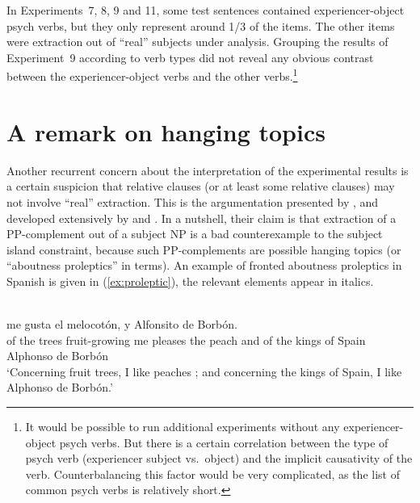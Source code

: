In Experiments~7, 8, 9 and 11, some test sentences contained experiencer-object psych verbs, but they only represent around 1/3 of the items. The other items were extraction out of ``real'' subjects under  analysis. Grouping the results of Experiment~9 according to verb types did not reveal any obvious contrast between the experiencer-object verbs and the other verbs.\footnote{It would be possible to run additional experiments without any experiencer-object psych verbs. But there is a certain correlation between the type of psych verb (experiencer subject vs.\ object) and the implicit causativity of the verb. Counterbalancing this factor would be very complicated, as the list of common psych verbs is relatively short.}

\section{A remark on hanging topics}
\label{ch:hanging-topics}

Another recurrent concern about the interpretation of the experimental results is a certain suspicion that relative clauses (or at least some relative clauses) may not involve ``real'' extraction.
This is the argumentation presented by \citet[82--85]{Giorgi.1991}, and developed extensively by \citet[Section 5]{Jurka.2010} and \citet[Section 2.3]{Uriagereka.2012}. 
In a nutshell, their claim is that extraction of a PP-complement out of a subject NP is a bad counterexample to the subject island constraint, because such PP-complements are possible hanging topics (or ``aboutness proleptics'' in  terms). An example of fronted aboutness proleptics in Spanish is given in (\ref{ex:proleptic}), the relevant elements appear in italics. 

\ea \citep[94]{Uriagereka.2012}\\
\gll {}    me gusta el melocotón, y      Alfonsito de Borbón.\\
of the trees fruit-growing me pleases the peach and of the kings of Spain Alphonso de Borbón \\
\glt `Concerning fruit trees, I like peaches ; and concerning the kings of Spain, I like Alphonso de Borbón.'
\label{ex:proleptic}
\z

